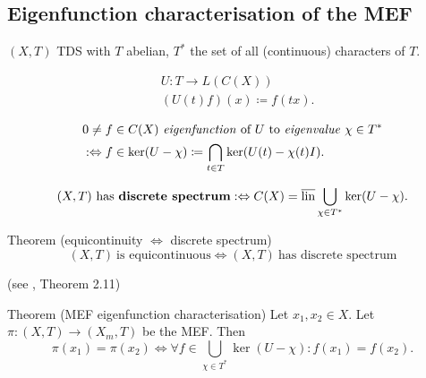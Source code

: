 \subsection{Eigenfunction characterisation of the MEF}
\begin{frame}
  $(X,T)$ TDS with $T$ abelian, $T^*$ the set of all (continuous) characters of $T$.
\begin{definition}
  \begin{equation*}
    \begin{split}
      &U : T \longrightarrow L(C(X)) \\
      &(U(t) f)(x) \coloneq f(tx).
    \end{split}
  \end{equation*}
   \end{definition}
   \pause
   \begin{definition}
   \begin{equation*}
    \begin{split}
      &0 \neq f \in C(X) \ \text{\emph{eigenfunction} of} \ U \ \text{to \emph{eigenvalue}} \ \chi \in T^*   \\
 &:\Leftrightarrow f \in \ker (U-\chi)\coloneq \bigcap_{t \in T} \ker (U(t)- \chi (t)I).
    \end{split}
      \end{equation*}
   \end{definition}
\end{frame}
\begin{frame}[fragile]
 \begin{definition}
  \begin{equation*}
    (X,T) \ \text{has \textbf{discrete spectrum}}:\Leftrightarrow C(X) = \overline{\operatorname{lin}} \bigcup_{\chi \in T^*} \ker (U- \chi).
  \end{equation*}
\end{definition}
\pause 
  \begin{alertblock}{Theorem (equicontinuity $\Leftrightarrow$ discrete spectrum)}%
  \begin{equation*}
    (X,T) \ \text{is equicontinuous} \Leftrightarrow (X,T) \ \text{has discrete spectrum}
  \end{equation*}

    \hfill(see \cite{HK2023}, Theorem 2.11)
\end{alertblock}
\pause
  \begin{alertblock}{Theorem (MEF eigenfunction characterisation)}
  \label{thm:MEF_EFchar}
  Let $x_1,x_2 \in X$. Let $\pi : (X,T) \to (X_m,T)$ be the MEF.
  Then
  \begin{equation*}
  \pi (x_1) = \pi (x_2) \Leftrightarrow 
    \forall f \in \bigcup_{\chi \in T^*} \ker (U- \chi) : f(x_1) = f(x_2).
  \end{equation*}
\end{alertblock}
\end{frame}
